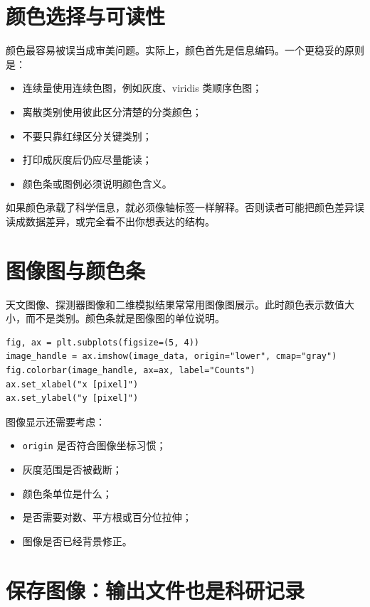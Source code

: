 \section{颜色选择与可读性}

颜色最容易被误当成审美问题。实际上，颜色首先是信息编码。一个更稳妥的原则是：

\begin{itemize}
    \item 连续量使用连续色图，例如灰度、viridis 类顺序色图；
    \item 离散类别使用彼此区分清楚的分类颜色；
    \item 不要只靠红绿区分关键类别；
    \item 打印成灰度后仍应尽量能读；
    \item 颜色条或图例必须说明颜色含义。
\end{itemize}

如果颜色承载了科学信息，就必须像轴标签一样解释。否则读者可能把颜色差异误读成数据差异，或完全看不出你想表达的结构。

\section{图像图与颜色条}

天文图像、探测器图像和二维模拟结果常常用图像图展示。此时颜色表示数值大小，而不是类别。颜色条就是图像图的单位说明。

\begin{examplebox}[最小图像图]
\begin{lstlisting}[style=pythonstyle]
fig, ax = plt.subplots(figsize=(5, 4))
image_handle = ax.imshow(image_data, origin="lower", cmap="gray")
fig.colorbar(image_handle, ax=ax, label="Counts")
ax.set_xlabel("x [pixel]")
ax.set_ylabel("y [pixel]")
\end{lstlisting}
\end{examplebox}

图像显示还需要考虑：

\begin{itemize}
    \item \texttt{origin} 是否符合图像坐标习惯；
    \item 灰度范围是否被截断；
    \item 颜色条单位是什么；
    \item 是否需要对数、平方根或百分位拉伸；
    \item 图像是否已经背景修正。
\end{itemize}

\section{保存图像：输出文件也是科研记录}

